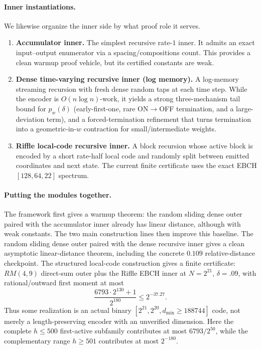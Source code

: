 \paragraph{Inner instantiations.}
We likewise organize the inner side by what proof role it serves.
\begin{enumerate}
\item \textbf{Accumulator inner.}
The simplest recursive rate-$1$ inner.  It admits an exact input--output enumerator via a spacing/compositions count.
This provides a clean warmup proof vehicle, but its certified constants are weak.
\item \textbf{Dense time-varying recursive inner (log memory).}
A log-memory streaming recursion with fresh dense random taps at each time step.
While the encoder is \(O(n\log n)\)-work, it yields a strong three-mechanism tail bound for \(p_w(\delta)\)
(early-first-one, rare ON\(\to\)OFF termination, and a large-deviation term),
and a forced-termination refinement that turns termination into a geometric-in-\(w\) contraction for small/intermediate weights.
\item \textbf{Riffle local-code recursive inner.}
A block recursion whose active block is encoded by a short rate-half local code and randomly split between emitted
coordinates and next state.  The current finite certificate uses the exact EBCH \([128,64,22]\) spectrum.
\end{enumerate}

\paragraph{Putting the modules together.}
The framework first gives a warmup theorem: the random sliding dense outer paired with the accumulator inner already has
linear distance, although with weak constants.  The two main construction lines then improve this baseline.  The random
sliding dense outer paired with the dense recursive inner gives a clean asymptotic linear-distance theorem, including the
concrete \(0.109\) relative-distance checkpoint.  The structured local-code construction gives a finite certificate:
\(RM(4,9)\) direct-sum outer plus the Riffle EBCH inner at \(N=2^{21}\), \(\delta=.09\), with rational/outward first moment
at most
\[
\frac{6793\cdot2^{130}+1}{2^{180}}\le 2^{-37.27}.
\]
Thus some realization is an actual binary
\([2^{21},2^{20},d_{\min}\ge188744]\) code, not merely a
length-preserving encoder with an unverified dimension.
Here the complete \(h\le500\) first-active subfamily contributes at most
\(6793/2^{50}\), while the complementary range \(h\ge501\) contributes at most
\(2^{-180}\).

